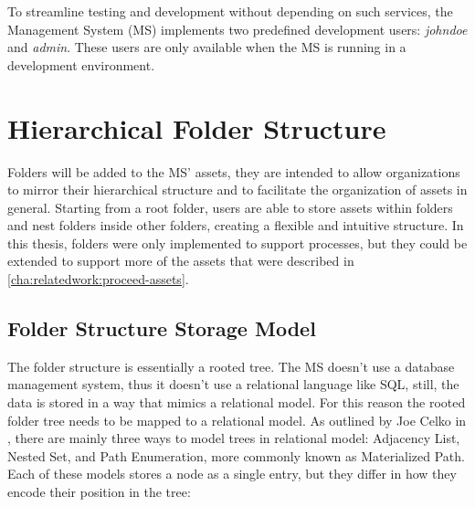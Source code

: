 To streamline testing and development without depending on such services,
the Management System (MS) implements two predefined development users: \textit{johndoe} and \textit{admin}.
These users are only available when the MS is running in a development environment.


%

\section{Hierarchical Folder Structure}
\label{cha:conceptanddesign:folders}

Folders will be added to the MS' assets,
they are intended to allow organizations to mirror their hierarchical structure and
to facilitate the organization of assets in general.
Starting from a root folder, users are able to store assets within folders and nest
folders inside other folders, creating a flexible and intuitive structure.
In this thesis, folders were only implemented to support processes, but they could be extended to
support more of the assets that were described in \ref{cha:relatedwork:proceed-assets}.

\subsection{Folder Structure Storage Model}


The folder structure is essentially a rooted tree.
The MS doesn't use a database management system, thus it doesn't use a relational
language like SQL, still, the data is stored in a way that mimics a relational model.
For this reason the rooted folder tree needs to be mapped to a relational model.
%
As outlined by Joe Celko in \cite[28]{celkoSQLTrees}, there are mainly three ways to model
trees in relational model:
Adjacency List, Nested Set, and  Path Enumeration, more commonly known as Materialized Path.
Each of these models stores a node as a single entry, but they differ in how they encode
their position in the tree:

